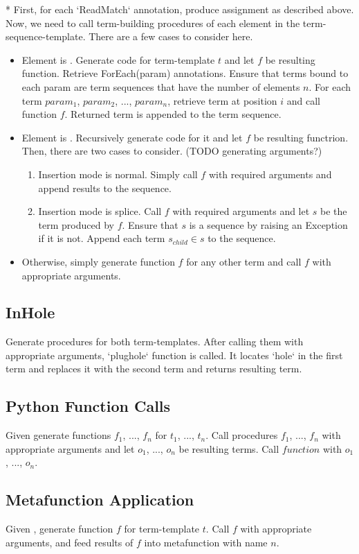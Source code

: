 * First, for each `ReadMatch` annotation, produce assignment as described above. Now, we need to call term-building procedures of each element in the term-sequence-template. There are a few cases to consider here. 

\begin{itemize}
	\item
	Element is \TermRepeat. Generate code for term-template $t$ and let $f$ be resulting function.  Retrieve ForEach(param) annotations. Ensure that terms bound to each param are term sequences that have the number of elements $n$. 
	For each term $param_1$, $param_2$, ..., $param_n$, retrieve term at position $i$ and call function $f$. Returned term is appended to the term sequence.
	\item
	Element is \PythonCall. Recursively generate code for it and let $f$ be resulting functrion. Then, there are two cases to consider. (TODO generating arguments?)
	\begin{enumerate}
	\item Insertion mode is normal. Simply call $f$ with required arguments and append results to the sequence.
	\item Insertion mode is splice. Call $f$ with required arguments and let $s$ be the term produced by $f$. Ensure that $s$ is a sequence by raising an Exception if it is not. Append each term $s_{child} \in s$ to the sequence.
	\end{enumerate}
	\item Otherwise, simply generate function $f$ for any other term and call $f$ with appropriate arguments. 
	\end{itemize}


\subsection{InHole}
Generate procedures for both term-templates. After calling them with appropriate arguments, `plughole` function is called. It locates `hole` in the first term and replaces it with the second term and returns resulting term.

\subsection{Python Function Calls}
Given \PythonCall generate functions $f_1$, ..., $f_n$ for $t_1$, ..., $t_n$. Call procedures $f_1$, ..., $f_n$ with appropriate arguments and let $o_1$, ..., $o_n$ be resulting terms. Call $function$ with $o_1$, ..., $o_n$.

\subsection{Metafunction Application}
Given \ApplyMetafunction, generate function $f$ for term-template $t$. Call $f$ with appropriate arguments, and feed results of $f$ into metafunction with name $n$.
